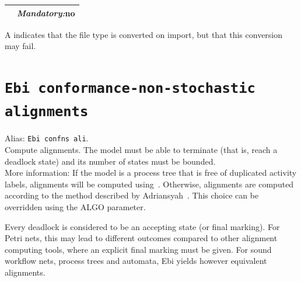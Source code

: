 {\begin{tabularx}{\linewidth}{lX}
&\textit{Mandatory:}\quad no\\
\bottomrule
\end{tabularx}
A \textdagger{} indicates that the file type is converted on import, but that this conversion may fail.
\clearpage\section{\texttt{Ebi conformance-non-stochastic alignments}}
\label{command:Ebi conformance-non-stochastic alignments}
Alias: \texttt{Ebi confns ali}.\\
Compute alignments.
The model must be able to terminate (that is, reach a deadlock state) and its number of states must be bounded.\\
More information: If the model is a process tree that is free of duplicated activity labels, alignments will be computed using~\cite{DBLP:conf/icpm/SchwanenPA24}.
        Otherwise, alignments are computed according to the method described by Adriansyah~\cite{DBLP:conf/edoc/AdriansyahDA11}.
        This choice can be overridden using the ALGO parameter.

        Every deadlock is considered to be an accepting state (or final marking).
        For Petri nets, this may lead to different outcomes compared to other alignment computing tools, where an explicit final marking must be given.
        For sound workflow nets, process trees and automata, Ebi yields however equivalent alignments.

}
